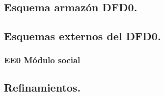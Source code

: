 \documentclass[12pt,a4paper]{article}
\begin{document}
\subsection{Esquema armazón DFD0.}
  \begin{center}
  \end{center}
\subsection{Esquemas externos del DFD0.}
	\subsubsection{EE0 Módulo social}
  \begin{center}
  \end{center}
	
\subsection{Refinamientos.}
\end{document}
